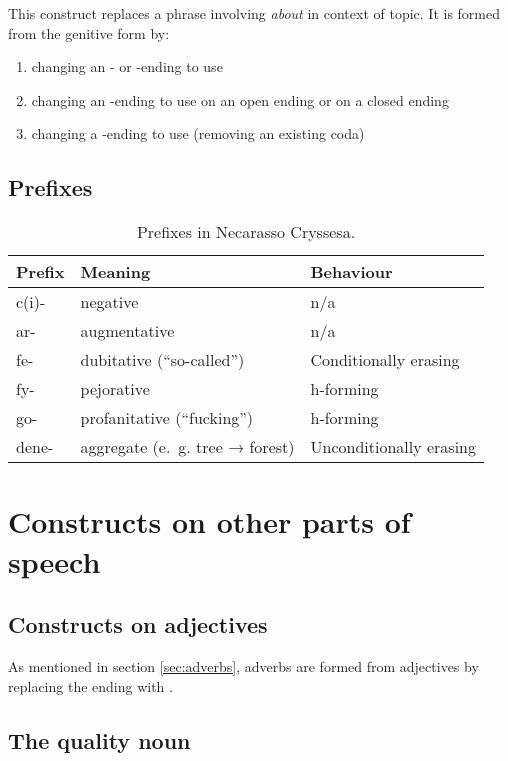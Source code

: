 \documentclass{book}
\begin{document}
This construct replaces a phrase involving  \emph{about} in context of topic. It is formed from the genitive form by:

\begin{enumerate}
  \item changing an - or -ending to use 
  \item changing an -ending to use  on an open ending or  on a closed ending
  \item changing a -ending to use  (removing an existing coda)
\end{enumerate}

\section{Prefixes}

\begin{table}[h]
  \caption{Prefixes in Necarasso Cryssesa.}
  \centering
	\begin{tabular}{|l|l|l|}
		\hline
		Prefix & Meaning & Behaviour \\ \hline
		c(i)- & negative & n/a \\
		ar- & augmentative & n/a \\
		fe- & dubitative (``so-called'') & Conditionally erasing \\
		fy- & pejorative & h-forming \\
		go- & profanitative (``fucking'') & h-forming \\
		dene- & aggregate (e.~g. tree → forest) & Unconditionally erasing \\
		\hline
	\end{tabular}
\end{table}

\chapter{Constructs on other parts of speech}

\section{Constructs on adjectives}

As mentioned in section \ref{sec:adverbs}, adverbs are formed from adjectives by replacing the ending with .

\section{The quality noun}
\end{document}
